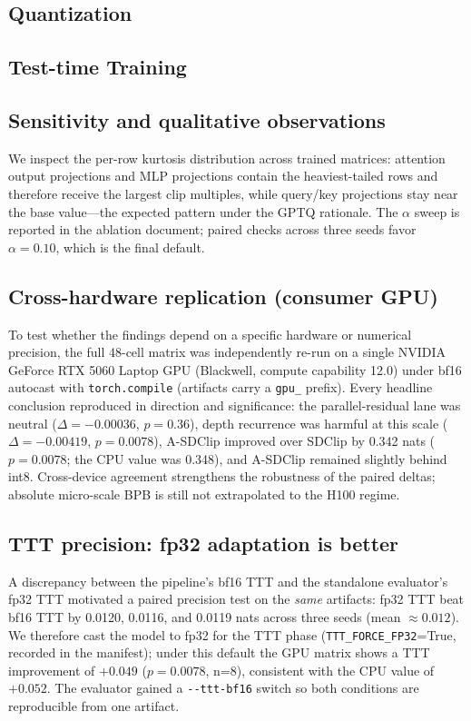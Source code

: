 \documentclass[10pt]{article}
\begin{document}
\subsection{Quantization}
\begin{center}

\end{center}

\subsection{Test-time Training}
\begin{center}

\end{center}

\subsection{Sensitivity and qualitative observations}
We inspect the per-row kurtosis distribution across trained matrices: attention output
projections and MLP projections contain the heaviest-tailed rows and therefore receive
the largest clip multiples, while query/key projections stay near the base value---the
expected pattern under the GPTQ rationale. The $\alpha$ sweep is reported in the
ablation document; paired checks across three seeds favor $\alpha=0.10$, which is
the final default.

\subsection{Cross-hardware replication (consumer GPU)}
To test whether the findings depend on a specific hardware or numerical precision,
the full 48-cell matrix was independently re-run on a single NVIDIA GeForce RTX 5060
Laptop GPU (Blackwell, compute capability 12.0) under bf16 autocast with
\texttt{torch.compile} (artifacts carry a \texttt{gpu\_} prefix). Every headline
conclusion reproduced in direction and significance: the parallel-residual lane was
neutral ($\Delta=-0.00036$, $p=0.36$), depth recurrence was harmful at this scale
($\Delta=-0.00419$, $p=0.0078$), A-SDClip improved over SDClip by 0.342 nats
($p=0.0078$; the CPU value was 0.348), and A-SDClip remained slightly behind int8.
Cross-device agreement strengthens the robustness of the paired deltas; absolute
micro-scale BPB is still not extrapolated to the H100 regime.

\subsection{TTT precision: fp32 adaptation is better}
A discrepancy between the pipeline's bf16 TTT and the standalone evaluator's fp32
TTT motivated a paired precision test on the \emph{same} artifacts: fp32 TTT beat
bf16 TTT by 0.0120, 0.0116, and 0.0119 nats across three seeds (mean $\approx
0.012$). We therefore cast the model to fp32 for the TTT phase
(\texttt{TTT\_FORCE\_FP32}=True, recorded in the manifest); under this default the
GPU matrix shows a TTT improvement of $+0.049$ ($p=0.0078$, n=8), consistent with
the CPU value of $+0.052$. The evaluator gained a \texttt{-{-}ttt-bf16} switch so
both conditions are reproducible from one artifact.
\end{document}

